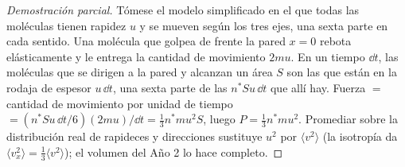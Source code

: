 \begin{proof}[Demostración parcial]
Tómese el modelo simplificado en el que todas las moléculas tienen rapidez
$u$ y se mueven según los tres ejes, una sexta parte en cada sentido. Una
molécula que golpea de frente la pared $x = 0$ rebota elásticamente y le
entrega la cantidad de movimiento $2mu$. En un tiempo $\dd t$, las
moléculas que se dirigen a la pared y alcanzan un área $S$ son las que
están en la rodaja de espesor $u\,\dd t$, una sexta parte de las
$n^*Su\,\dd t$ que allí hay. Fuerza $= $ cantidad de movimiento por unidad
de tiempo $= (n^*Su\,\dd t/6)(2mu)/\dd t = \tfrac13 n^*mu^2S$, luego
$P = \tfrac13 n^*mu^2$. Promediar sobre la distribución real de rapideces y
direcciones sustituye $u^2$ por $\langle v^2\rangle$ (la isotropía da
$\langle v_x^2\rangle = \tfrac13\langle v^2\rangle$); el volumen del Año 2 lo
hace completo.
\end{proof}

